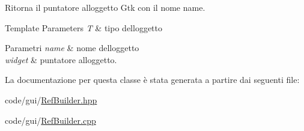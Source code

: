 Ritorna il puntatore all\textquotesingle{}oggetto Gtk con il nome name. 
\begin{DoxyTemplParams}{Template Parameters}
{\em T} & tipo dell\textquotesingle{}oggetto \\
\hline
\end{DoxyTemplParams}

\begin{DoxyParams}{Parametri}
{\em name} & nome dell\textquotesingle{}oggetto \\
\hline
{\em widget} & puntatore all\textquotesingle{}oggetto. \\
\hline
\end{DoxyParams}


La documentazione per questa classe è stata generata a partire dai seguenti file\+:\begin{DoxyCompactItemize}
\item 
code/gui/\hyperlink{_ref_builder_8hpp}{Ref\+Builder.\+hpp}\item 
code/gui/\hyperlink{_ref_builder_8cpp}{Ref\+Builder.\+cpp}\end{DoxyCompactItemize}
